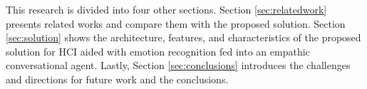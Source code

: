 \documentclass[runningheads]{llncs}
\begin{document}
This research is divided into four other sections. Section \ref{sec:relatedwork} presents related works and compare them with the proposed solution. Section \ref{sec:solution} shows the architecture, features, and characteristics of the proposed solution for HCI aided with emotion recognition fed into an empathic conversational agent. Lastly, Section \ref{sec:conclusions}  introduces the challenges and directions for future work and the conclusions. 

%
%
%
%
\end{document}
